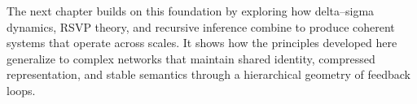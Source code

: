 The next chapter builds on this foundation by exploring how delta–sigma dynamics, RSVP theory, and recursive inference combine to produce coherent systems that operate across scales. It shows how the principles developed here generalize to complex networks that maintain shared identity, compressed representation, and stable semantics through a hierarchical geometry of feedback loops.

